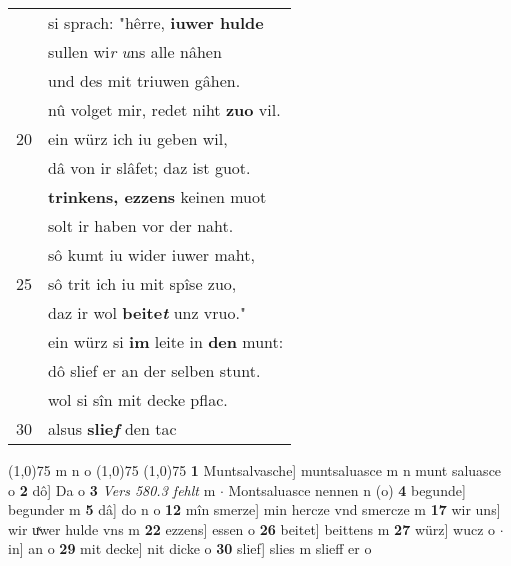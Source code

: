 \documentclass[8pt,a4paper,notitlepage]{article}
\begin{document}
\begin{table}[ht]
\begin{minipage}[t]{0.5\linewidth}
\begin{tabular}{rl}
 & si sprach: "hêrre, \textbf{iuwer hulde}\\ 
 & sullen wi\textit{r} \textit{u}ns alle nâhen\\ 
 & und des mit triuwen gâhen.\\ 
 & nû volget mir, redet niht \textbf{zuo} vil.\\ 
20 & ein würz ich iu geben wil,\\ 
 & dâ von ir slâfet; daz ist guot.\\ 
 & \textbf{trinkens, ezzens} keinen muot\\ 
 & solt ir haben vor der naht.\\ 
 & sô kumt iu wider iuwer maht,\\ 
25 & sô trit ich iu mit spîse zuo,\\ 
 & daz ir wol \textbf{beite\textit{t}} unz vruo."\\ 
 & ein würz si \textbf{im} leite in \textbf{den} munt:\\ 
 & dô slief er an der selben stunt.\\ 
 & wol si sîn mit decke pflac.\\ 
30 & alsus \textbf{slie\textit{f}} den tac\\ 
\end{tabular}
\scriptsize
\line(1,0){75} \newline
m n o \newline
\line(1,0){75} \newline
\newline
\line(1,0){75} \newline
\textbf{1} Muntsalvasche] muntsaluasce m n munt saluasce o \textbf{2} dô] Da o \textbf{3} \textit{Vers 580.3 fehlt} m   $\cdot$ Montsaluasce nennen n (o) \textbf{4} begunde] begunder m \textbf{5} dâ] do n o \textbf{12} mîn smerze] min hercze vnd smercze m \textbf{17} wir uns] wir uͯwer hulde vns m \textbf{22} ezzens] essen o \textbf{26} beitet] beittens m \textbf{27} würz] wucz o  $\cdot$ in] an o \textbf{29} mit decke] nit dicke o \textbf{30} slief] slies m slieff er o \newline
\end{minipage}
\end{table}
\newpage
\end{document}
